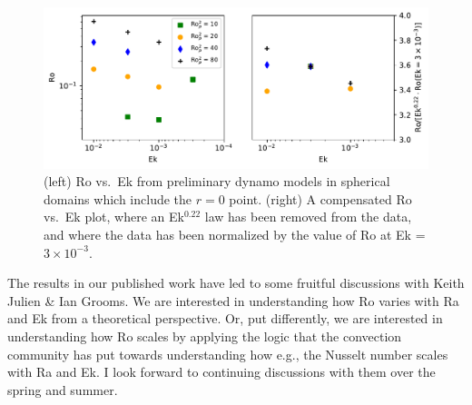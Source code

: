 \begin{figure}[ht!]
\includegraphics[width=\textwidth]{./figs/revisions/mdwarfs_rop.pdf}
\caption[Filtered initial \pro$\,$ results and scalings in spherical simulations.]{ (left) Ro vs.~Ek from preliminary dynamo models in spherical domains which include the $r = 0$ point.
		  (right) A compensated Ro vs.~Ek plot, where an Ek$^{0.22}$ law has been removed from the data, and where the data has been normalized by the value of Ro at Ek = $3 \times 10^{-3}$.
	\label{fig:mdwarfs_rop} }
\end{figure}


The results in our published work have led to some fruitful discussions with Keith Julien \& Ian Grooms.
We are interested in understanding how Ro varies with Ra and Ek from a theoretical perspective.
Or, put differently, we are interested in understanding how Ro scales by applying the logic that the \RB convection community has put towards understanding how e.g., the Nusselt number scales with Ra and Ek.
I look forward to continuing discussions with them over the spring and summer.


